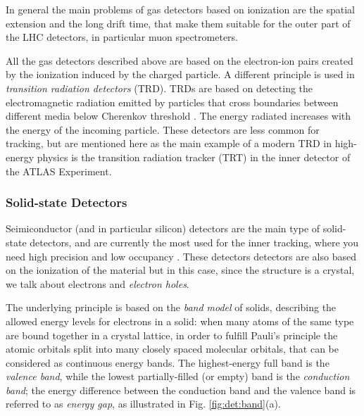 In general the main problems of gas detectors based on ionization are the spatial extension and the long drift time, that make them suitable for the outer part of the LHC detectors, in particular muon spectrometers.

All the gas detectors described above are based on the electron-ion pairs created by the ionization induced by the charged particle. A different principle is used in \textit{transition radiation detectors} (TRD). TRDs are based on detecting the electromagnetic radiation emitted by particles that cross boundaries between different media below Cherenkov threshold \cite{1402-4896-1982-T2A-024}. The energy radiated increases with the energy of the incoming particle. These detectors are less common for tracking, but are mentioned here as the main example of a modern TRD in high-energy physics is the transition radiation tracker (TRT) in the inner detector of the ATLAS Experiment.

\subsubsection*{Solid-state Detectors}

Seimiconductor (and in particular silicon) detectors are the main type of solid-state detectors, and are currently the most used for the inner tracking, where you need high precision and low occupancy \cite{Hartmann:2009zza}. These detectors detectors are also based on the ionization of the material but in this case, since the structure is a crystal, we talk about electrons and \textit{electron holes}. 

The underlying principle is based on the \textit{band model} of solids, describing the allowed energy levels for electrons in a solid: when many atoms of the same type are bound together in a crystal lattice, in order to fulfill Pauli's principle the atomic orbitals split into many closely spaced molecular orbitals, that can be considered as continuous energy bands. The highest-energy full band is the \textit{valence band}, while the lowest partially-filled (or empty) band is the \textit{conduction band}; the energy difference between the conduction band and the valence band is referred to as \textit{energy gap}, as illustrated in Fig. \ref{fig:det:band}(a). 

